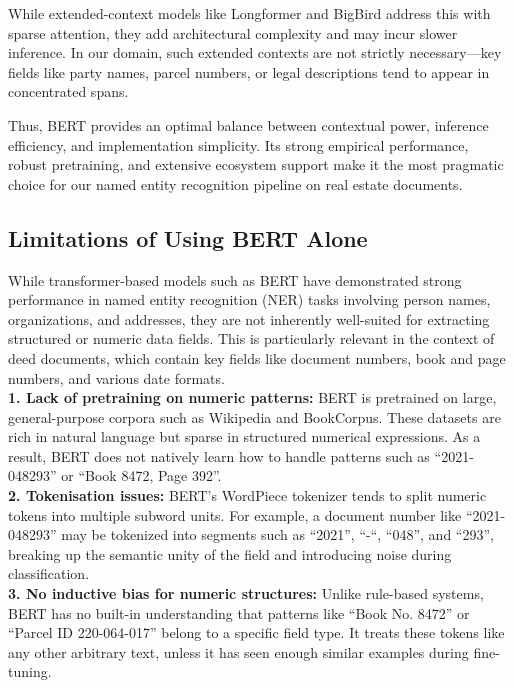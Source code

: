 \documentclass{article}
\begin{document}
While extended-context models like Longformer \cite{beltagy2020longformer} and BigBird \cite{zaheer2020bigbird} address this with sparse attention, they add architectural complexity and may incur slower inference. In our domain, such extended contexts are not strictly necessary—key fields like party names, parcel numbers, or legal descriptions tend to appear in concentrated spans.

Thus, BERT provides an optimal balance between contextual power, inference efficiency, and implementation simplicity. Its strong empirical performance, robust pretraining, and extensive ecosystem support make it the most pragmatic choice for our named entity recognition pipeline on real estate documents.



\subsection{Limitations of Using BERT Alone}

While transformer-based models such as BERT have demonstrated strong performance in named entity recognition (NER) tasks involving person names, organizations, and addresses, they are not inherently well-suited for extracting structured or numeric data fields. This is particularly relevant in the context of deed documents, which contain key fields like document numbers, book and page numbers, and various date formats. \\

\textbf{1. Lack of pretraining on numeric patterns:} BERT is pretrained on large, general-purpose corpora such as Wikipedia and BookCorpus. These datasets are rich in natural language but sparse in structured numerical expressions. As a result, BERT does not natively learn how to handle patterns such as ``2021-048293'' or ``Book 8472, Page 392''. \\

\textbf{2. Tokenisation issues:} BERT's WordPiece tokenizer tends to split numeric tokens into multiple subword units. \cite{schuster2012japanese} For example, a document number like ``2021-048293'' may be tokenized into segments such as ``2021'', ``-``, ``048'', and ``293'', breaking up the semantic unity of the field and introducing noise during classification. \\

\textbf{3. No inductive bias for numeric structures:} Unlike rule-based systems, BERT has no built-in understanding that patterns like ``Book No. 8472'' or ``Parcel ID 220-064-017'' belong to a specific field type. It treats these tokens like any other arbitrary text, unless it has seen enough similar examples during fine-tuning. \cite{wallace2019nlpnumber} \\
\end{document}
